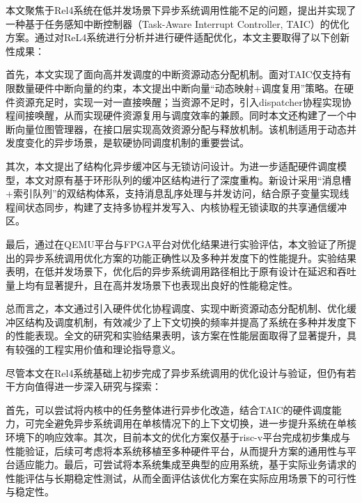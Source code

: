 \begin{conclusion}

本文聚焦于Rel4系统在低并发场景下异步系统调用性能不足的问题，提出并实现了一种基于任务感知中断控制器（Task-Aware Interrupt Controller, TAIC）的优化方案。通过对ReL4系统进行分析并进行硬件适配优化，本文主要取得了以下创新性成果：

首先，本文实现了面向高并发调度的中断资源动态分配机制。面对TAIC仅支持有限数量硬件中断向量的约束，本文提出中断向量“动态映射+调度复用”策略。在硬件资源充足时，实现一对一直接唤醒；当资源不足时，引入dispatcher协程实现协程间接唤醒，从而实现硬件资源复用与调度效率的兼顾。同时本文还构建了一个中断向量位图管理器，在接口层实现高效资源分配与释放机制。该机制适用于动态并发度变化的异步场景，是软硬协同调度机制的重要尝试。

其次，本文提出了结构化异步缓冲区与无锁访问设计。为进一步适配硬件调度模型，本文对原有基于环形队列的缓冲区结构进行了深度重构。新设计采用“消息槽+索引队列”的双结构体系，支持消息乱序处理与并发访问，结合原子变量实现线程间状态同步，构建了支持多协程并发写入、内核协程无锁读取的共享通信缓冲区。

最后，通过在QEMU平台与FPGA平台对优化结果进行实验评估，本文验证了所提出的异步系统调用优化方案的功能正确性以及多种并发度下的性能提升。实验结果表明，在低并发场景下，优化后的异步系统调用路径相比于原有设计在延迟和吞吐量上均有显著提升，且在高并发场景下也表现出良好的性能稳定性。

总而言之，本文通过引入硬件优化协程调度、实现中断资源动态分配机制、优化缓冲区结构及调度机制，有效减少了上下文切换的频率并提高了系统在多种并发度下的性能表现。全文的研究和实验结果表明，该方案在性能层面取得了显著提升，具有较强的工程实用价值和理论指导意义。

尽管本文在Rel4系统基础上初步完成了异步系统调用的优化设计与验证，但仍有若干方向值得进一步深入研究与探索：

首先，可以尝试将内核中的任务整体进行异步化改造，结合TAIC的硬件调度能力，可完全避免异步系统调用在单核情况下的上下文切换，进一步提升系统在单核环境下的响应效率。其次，目前本文的优化方案仅基于risc-v平台完成初步集成与性能验证，后续可考虑将本系统移植至多种硬件平台，从而提升方案的通用性与平台适应能力。最后，可尝试将本系统集成至典型的应用系统，基于实际业务请求的性能评估与长期稳定性测试，从而全面评估该优化方案在实际应用场景下的可行性与稳定性。

\end{conclusion}
